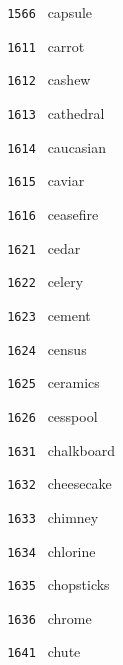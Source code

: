 \documentclass[11pt]{article}
\begin{document}
\begin{multicols}{6}
\noindent \texttt{ 1566 } \hspace{1mm} capsule  \par
\noindent \texttt{ 1611 } \hspace{1mm} carrot  \par
\noindent \texttt{ 1612 } \hspace{1mm} cashew  \par
\noindent \texttt{ 1613 } \hspace{1mm} cathedral  \par
\noindent \texttt{ 1614 } \hspace{1mm} caucasian  \par
\noindent \texttt{ 1615 } \hspace{1mm} caviar  \par
\noindent \texttt{ 1616 } \hspace{1mm} ceasefire  \par
\noindent \texttt{ 1621 } \hspace{1mm} cedar  \par
\noindent \texttt{ 1622 } \hspace{1mm} celery  \par
\noindent \texttt{ 1623 } \hspace{1mm} cement  \par
\noindent \texttt{ 1624 } \hspace{1mm} census  \par
\noindent \texttt{ 1625 } \hspace{1mm} ceramics  \par
\noindent \texttt{ 1626 } \hspace{1mm} cesspool  \par
\noindent \texttt{ 1631 } \hspace{1mm} chalkboard  \par
\noindent \texttt{ 1632 } \hspace{1mm} cheesecake  \par
\noindent \texttt{ 1633 } \hspace{1mm} chimney  \par
\noindent \texttt{ 1634 } \hspace{1mm} chlorine  \par
\noindent \texttt{ 1635 } \hspace{1mm} chopsticks  \par
\noindent \texttt{ 1636 } \hspace{1mm} chrome  \par
\noindent \texttt{ 1641 } \hspace{1mm} chute  \par

\end{multicols}
\end{document}
